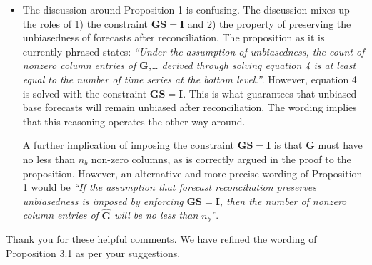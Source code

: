 \documentclass[11pt,a4paper,]{article}
\renewenvironment{quote}
               {\list{}{\rightmargin\leftmargin}%
                \item\relax\color[RGB]{0,150,0}}
               {\endlist}
\begin{document}
\begin{itemize}
\item
  The discussion around Proposition 1 is confusing. The discussion mixes
  up the roles of 1) the constraint \(\bm{GS}=\bm{I}\) and 2) the
  property of preserving the unbiasedness of forecasts after
  reconciliation. The proposition as it is currently phrased states:
  \emph{``Under the assumption of unbiasedness, the count of nonzero
  column entries of} \(\bm{G}\)\emph{,\ldots{} derived through solving
  equation 4 is at least equal to the number of time series at the
  bottom level.''}. However, equation 4 is solved with the constraint
  \(\bm{GS}=\bm{I}\). This is what guarantees that unbiased base
  forecasts will remain unbiased after reconciliation. The wording
  implies that this reasoning operates the other way around.

  A further implication of imposing the constraint \(\bm{GS}=\bm{I}\) is
  that \(\bm{G}\) must have no less than \(n_b\) non-zero columns, as is
  correctly argued in the proof to the proposition. However, an
  alternative and more precise wording of Proposition 1 would be
  \emph{``If the assumption that forecast reconciliation preserves
  unbiasedness is imposed by enforcing} \(\bm{GS}=\bm{I}\)\emph{, then
  the number of nonzero column entries of} \(\hat{\bm{G}}\) \emph{will
  be no less than} \(n_b\)\emph{''}.
\end{itemize}

\begin{quote}
Thank you for these helpful comments. We have refined the wording of
Proposition 3.1 as per your suggestions.
\end{quote}
\end{document}
